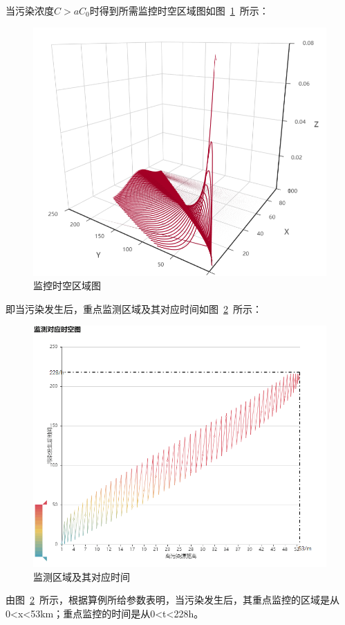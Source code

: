\documentclass{whutmod}
\begin{document}
	当污染浓度$C>aC_{0}$时得到所需监控时空区域图如图~\ref{ndfb}~所示：
		\begin{figure}[H]
	\centering
	\includegraphics[width=\textwidth]{figures/ndfb.png}
	\caption{监控时空区域图}\label{ndfb}
\end{figure}
	
	即当污染发生后，重点监测区域及其对应时间如图~\ref{hblq}~所示：
			\begin{figure}[H]
		\centering
		\includegraphics[width=.9\textwidth]{figures/hblj.png}
		\caption{监测区域及其对应时间}\label{hblq}
	\end{figure}
	由图~\ref{hblq}~所示，根据算例所给参数表明，当污染发生后，其重点监控的区域是从0<x<53km；重点监控的时间是从0<t<228h。
\end{document}
